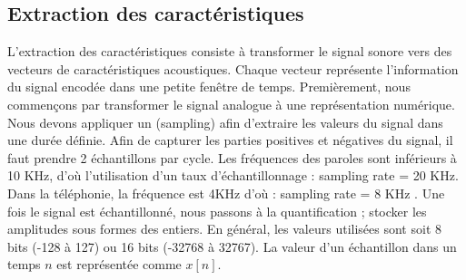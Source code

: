 \documentclass{KodeBook}
\begin{document}
%

\subsection{Extraction des caractéristiques}

L'extraction des caractéristiques consiste à transformer le signal sonore vers des vecteurs de caractéristiques acoustiques.
Chaque vecteur représente l'information du signal encodée dans une petite fenêtre de temps.
Premièrement, nous commençons par transformer le signal analogue à une représentation numérique.
Nous devons appliquer un  (sampling) afin d'extraire les valeurs du signal dans une durée définie. 
Afin de capturer les parties positives et négatives du signal, il faut prendre 2 échantillons par cycle.
Les fréquences des paroles sont inférieurs à 10 KHz, d'où l'utilisation d'un taux d'échantillonnage : sampling rate = 20 KHz. 
Dans la téléphonie, la fréquence est 4KHz d'où : sampling rate = 8 KHz \cite{2019-jurafsky-martin}. 
Une fois le signal est échantillonné, nous passons à la quantification ; stocker les amplitudes sous formes des entiers.
En général, les valeurs utilisées sont soit 8 bits (-128 à 127) ou 16 bits (-32768 à 32767).
La valeur d'un échantillon dans un temps $n$ est représentée comme $x[n]$.
\end{document}
